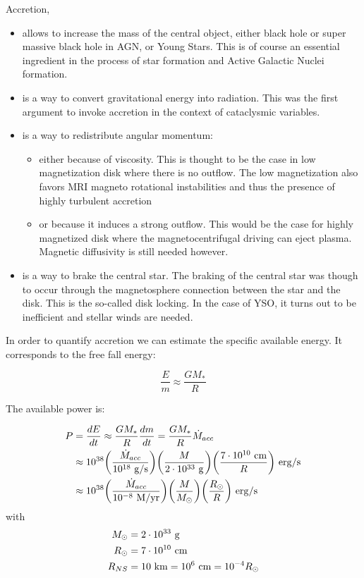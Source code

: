 \documentclass[10pt,a4paper,english]{article}
\let\originalleft\left
\let\originalright\right
\renewcommand{\left}{\mathopen{}\mathclose\bgroup\originalleft}
\renewcommand{\right}{\aftergroup\egroup\originalright}
\begin{document}
Accretion,
\begin{itemize}
    \item allows to increase the mass of the central object, either black hole
          or super massive black hole in AGN, or Young Stars. This is of course
          an essential ingredient in the process of star formation and Active
          Galactic Nuclei formation.
    \item is a way to convert gravitational energy into radiation. This was the
          first argument to invoke accretion in the context of cataclysmic
          variables.
    \item is a way to redistribute angular momentum:
          \begin{itemize}
              \item either because of viscosity. This is thought to be the case
                    in low magnetization disk where there is no outflow. The
                    low magnetization also favors MRI magneto rotational
                    instabilities and thus the presence of highly turbulent
                    accretion
              \item or because it induces a strong outflow. This would be the
                    case for highly magnetized disk where the
                    magnetocentrifugal driving can eject plasma. Magnetic
                    diffusivity is still needed however.
          \end{itemize}
    \item is a way to brake the central star. The braking of the central star
          was though to occur through the magnetosphere connection between the
          star and the disk. This is the so-called disk locking. In the case of
          YSO, it turns out to be inefficient and stellar winds are needed.
\end{itemize}

In order to quantify accretion we can estimate the specific available energy.
It corresponds to the free fall energy:

\begin{equation}
  \frac{E}{m} \approx \frac{GM_*}{R}
\end{equation}

The available power is:

\begin{align}
P & = \frac{dE}{dt} \approx \frac{GM_*}{R} \frac{dm}{dt} = \frac{GM_*}{R} \dot{M}_{acc}
    \\
  &\approx 10^{38} \left(\frac{\dot{M}_{acc}}{10^{18} \un{g/s}}\right) \left(\frac{M}{2\E{33}\un{g}}\right) \left(\frac{7\E{10}\un{cm}}{R}\right) \un{erg/s}
    \\
  &\approx 10^{38} \left(\frac{\dot{M}_{acc}}{10^{-8} \un{M/yr}}\right) \left(\frac{M}{M_{\odot}}\right) \left(\frac{R_{\odot}}{R}\right) \un{erg/s}
\end{align}
with
\begin{align}
  M_{\odot} &= 2 \cdot 10^{33}\ \mathrm{g} \\
  R_{\odot} &= 7 \cdot 10^{10}\ \mathrm{cm} \\
  R_{NS}   &= 10 \ \mathrm{km} = 10^{6} \ \mathrm{cm} = 10^{-4} R_{\odot}
\end{align}
\end{document}
